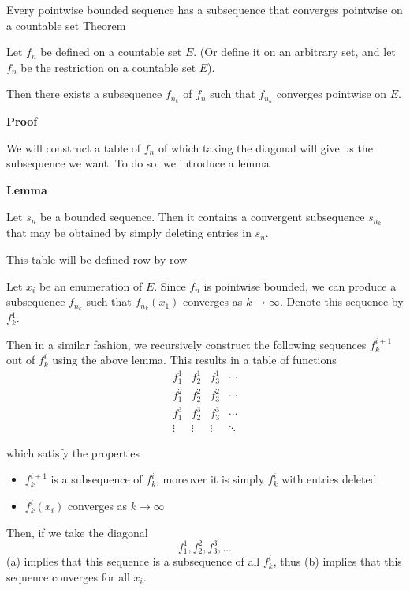 \begin{result}
    {Every pointwise bounded sequence has a subsequence that converges pointwise on a countable set}
    {Theorem}

    Let $f_n$ be defined on a countable set $E$. (Or define it on an arbitrary set, and let $f_n$ be the restriction on a countable set $E$).

    Then there exists a subsequence $f_{n_k}$ of $f_n$ such that $f_{n_k}$ converges pointwise on $E$.

    \textbf{Proof}

    We will construct a table of $f_n$ of which taking the diagonal will give us the subsequence we want. To do so, we introduce a lemma

    \begin{myboxed}
    \textbf{Lemma}

    Let $s_n$ be a bounded sequence. Then it contains a convergent subsequence $s_{n_k}$ that may be obtained by simply deleting entries in $s_n$.
    \end{myboxed}

    This table will be defined row-by-row

    Let $x_i$ be an enumeration of $E$. Since $f_n$ is pointwise bounded, we can produce a subsequence $f_{n_k}$ such that $f_{n_k}(x_1)$ converges as $k \to \infty$. Denote this sequence by $f^1_k$. 

    Then in a similar fashion, we recursively construct the following sequences $f^{i+1}_k$ out of $f^i_k$ using the above lemma. This results in a table of functions
    \[\begin{matrix}
        f^1_1 & f^1_2 & f^1_3 & \cdots \\
        f^2_1 & f^2_2 & f^2_3 & \cdots \\
        f^3_1 & f^3_2 & f^3_3 & \cdots \\
        \vdots & \vdots & \vdots & \ddots
    \end{matrix}\]

    which satisfy the properties
    \begin{itemize}
        \item[(a)] $f^{i+1}_k$ is a subsequence of $f^i_k$, moreover it is simply $f^i_k$ with entries deleted. 
        \item[(b)] $f^i_k(x_i)$ converges as $k \to \infty$
    \end{itemize}

    Then, if we take the diagonal
    \[f^1_1, f^2_2,  f^3_3, \ldots\] 
    (a) implies that this sequence is a subsequence of all $f^i_k$, thus (b) implies that this sequence converges for all $x_i$.
\end{result}

